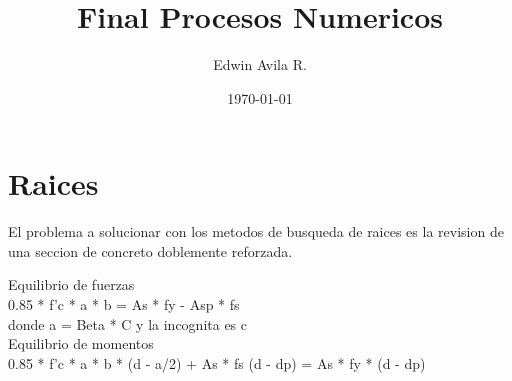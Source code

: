 \documentclass[12pt,twoside]{article}
\title{Final Procesos Numericos}
\author{Edwin Avila R.}
\date{\today}
\begin{document}
    \maketitle

    \section{Raices}

    El problema a solucionar con los metodos de busqueda de raices es la
    revision de una seccion de concreto doblemente reforzada.

    Equilibrio de fuerzas \\
    0.85 * f'c * a * b = As * fy - Asp * fs \\
    donde a = Beta * C y la incognita es c \\

    Equilibrio de momentos \\
    0.85 * f'c * a * b * (d - a/2) + As * fs (d - dp) = As * fy * (d - dp)
\end{document}
